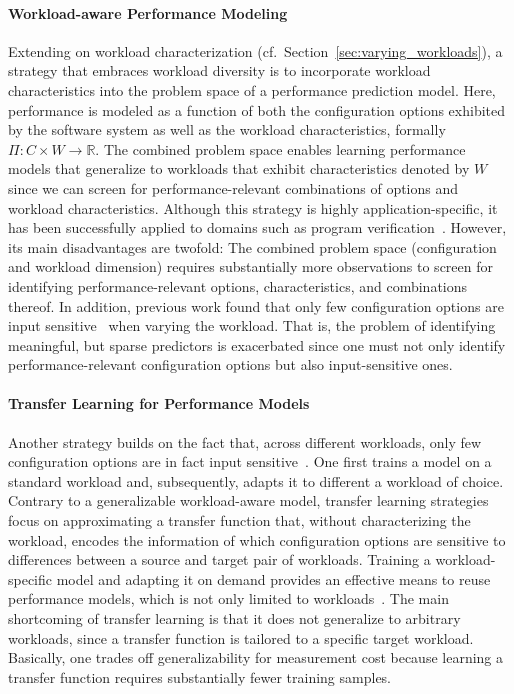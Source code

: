 {\paragraph{Workload-aware Performance Modeling}
\label{sec:workload-aware}
Extending on workload characterization (cf.~Section~\ref{sec:varying_workloads}), a strategy that embraces workload diversity is to incorporate workload characteristics into the problem space of a performance prediction model. Here, performance is modeled as a function of both the configuration options exhibited by the software system as well as the workload characteristics, formally $\Pi: C \times W \rightarrow \mathbb{R}$.
The combined problem space enables learning performance models that generalize to workloads that exhibit characteristics denoted by $W$ since we can screen for performance-relevant combinations of options and workload characteristics. Although this strategy is highly application-specific, it has been successfully applied to domains such as program verification~\cite{koc_satune_2021}. However, its main disadvantages are twofold: The combined problem space (configuration and workload dimension) requires substantially more observations to screen for identifying performance-relevant options, characteristics, and combinations thereof. In addition, previous work  found that  only few configuration options are input sensitive~\cite{jamishidi_transfer_2017} when varying the workload. That is, the problem of identifying meaningful, but sparse predictors is exacerbated since one must not only identify performance-relevant configuration options but also input-sensitive ones.

\paragraph{Transfer Learning for Performance Models}\label{sec:transfer}
Another strategy builds on the fact that, across different workloads, only few configuration options are in fact input sensitive~\cite{jamishidi_transfer_2017}. One first trains a model on a standard workload and, subsequently, adapts it to different a workload of choice. Contrary to a generalizable workload-aware model, transfer learning strategies focus on approximating a transfer function that, without characterizing the workload, encodes the information of which configuration options are sensitive to differences between a source and target pair of workloads. Training a workload-specific model and adapting it on demand provides an effective means to reuse performance models, which is not only limited to workloads~\cite{jamshidi_learning_2018, ding_bayesian_2020,valov_transferring_performance_2017,martin_transfer_2021}. The main shortcoming of transfer learning is that it does not generalize to arbitrary workloads, since a transfer function is tailored to a specific target workload. Basically, one trades off generalizability for measurement cost because learning a transfer function requires substantially fewer training samples.

}
